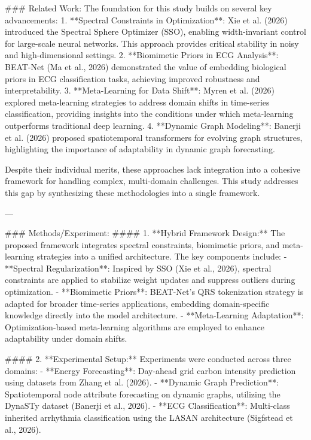 ### Related Work:
The foundation for this study builds on several key advancements:
1. **Spectral Constraints in Optimization**: Xie et al. (2026) introduced the Spectral Sphere Optimizer (SSO), enabling width-invariant control for large-scale neural networks. This approach provides critical stability in noisy and high-dimensional settings.
2. **Biomimetic Priors in ECG Analysis**: BEAT-Net (Ma et al., 2026) demonstrated the value of embedding biological priors in ECG classification tasks, achieving improved robustness and interpretability.
3. **Meta-Learning for Data Shift**: Myren et al. (2026) explored meta-learning strategies to address domain shifts in time-series classification, providing insights into the conditions under which meta-learning outperforms traditional deep learning.
4. **Dynamic Graph Modeling**: Banerji et al. (2026) proposed spatiotemporal transformers for evolving graph structures, highlighting the importance of adaptability in dynamic graph forecasting.

Despite their individual merits, these approaches lack integration into a cohesive framework for handling complex, multi-domain challenges. This study addresses this gap by synthesizing these methodologies into a single framework.

---

### Methods/Experiment:
#### 1. **Hybrid Framework Design:**
The proposed framework integrates spectral constraints, biomimetic priors, and meta-learning strategies into a unified architecture. The key components include:
- **Spectral Regularization**: Inspired by SSO (Xie et al., 2026), spectral constraints are applied to stabilize weight updates and suppress outliers during optimization.
- **Biomimetic Priors**: BEAT-Net's QRS tokenization strategy is adapted for broader time-series applications, embedding domain-specific knowledge directly into the model architecture.
- **Meta-Learning Adaptation**: Optimization-based meta-learning algorithms are employed to enhance adaptability under domain shifts.

#### 2. **Experimental Setup:**
Experiments were conducted across three domains:
- **Energy Forecasting**: Day-ahead grid carbon intensity prediction using datasets from Zhang et al. (2026).
- **Dynamic Graph Prediction**: Spatiotemporal node attribute forecasting on dynamic graphs, utilizing the DynaSTy dataset (Banerji et al., 2026).
- **ECG Classification**: Multi-class inherited arrhythmia classification using the LASAN architecture (Sigfstead et al., 2026).

